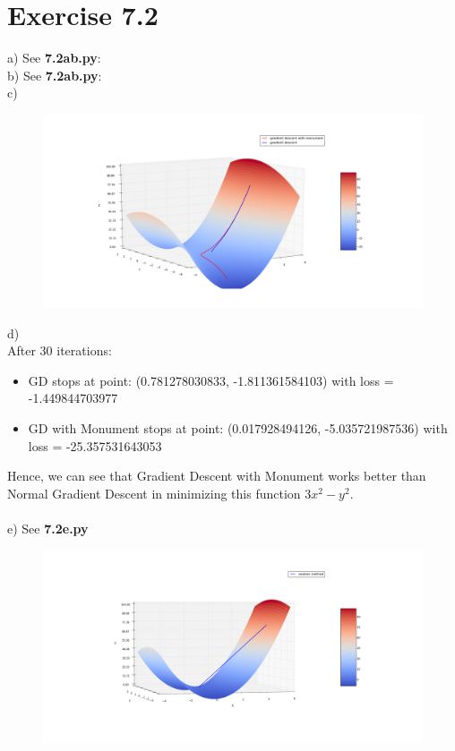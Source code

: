 \documentclass{article}
\begin{document}
\section*{Exercise 7.2}
a) See \textbf{7.2ab.py}:\\
b) See \textbf{7.2ab.py}:\\
c)
\begin{figure}[ht]
	\centering
	\includegraphics[scale=0.25]{72.png}
\end{figure}
\newpage
d)\\
After 30 iterations:\\
\begin{itemize}
\item GD stops at point: (0.781278030833, -1.811361584103) with loss = -1.449844703977
\item GD with Monument stops at point: (0.017928494126, -5.035721987536) with loss = -25.357531643053
\end{itemize}

Hence, we can see that Gradient Descent with Monument works better than Normal Gradient Descent in minimizing this function $3x^2 - y^2$.\\\\
e) See \textbf{7.2e.py}

\begin{figure}[ht]
	\centering
	\includegraphics[scale=0.3]{72e.png}
\end{figure}
\end{document}
